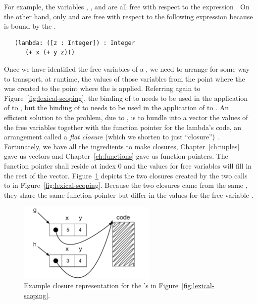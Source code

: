 \documentclass[11pt]{book}
\begin{document}
For example, the variables , , and  are all
free with respect to the expression .  On the
other hand, only  and  are free with respect to the
following expression because  is bound by the .
\begin{lstlisting}
   (lambda: ([z : Integer]) : Integer
      (+ x (+ y z)))
\end{lstlisting}

Once we have identified the free variables of a , we need
to arrange for some way to transport, at runtime, the values of those
variables from the point where the  was created to the
point where the  is applied. Referring again to
Figure~\ref{fig:lexical-scoping}, the binding of  to 
needs to be used in the application of  to , but the
binding of  to  needs to be used in the application of
 to . An efficient solution to the problem, due to
\citet{Cardelli:1983aa}, is to bundle into a vector the values of the
free variables together with the function pointer for the lambda's
code, an arrangement called a \emph{flat closure} (which we shorten to
just ``closure'') . Fortunately, we have all the ingredients to make
closures, Chapter~\ref{ch:tuples} gave us vectors and
Chapter~\ref{ch:functions} gave us function pointers. The function
pointer shall reside at index $0$ and the values for free variables
will fill in the rest of the vector. Figure~\ref{fig:closures} depicts
the two closures created by the two calls to  in
Figure~\ref{fig:lexical-scoping}.  Because the two closures came from
the same , they share the same function pointer but differ
in the values for the free variable .

\begin{figure}[tbp]
\centering \includegraphics[width=0.6\textwidth]{figs/closures}
\caption{Example closure representation for the 's
  in Figure~\ref{fig:lexical-scoping}.}
\label{fig:closures}
\end{figure}
\end{document}
